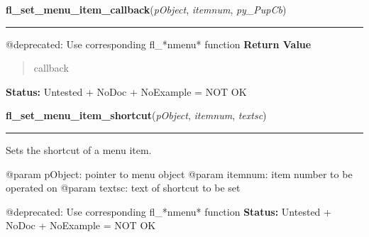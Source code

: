 \hspace{.8\funcindent}\begin{boxedminipage}{\funcwidth}

    \raggedright \textbf{fl\_set\_menu\_item\_callback}(\textit{pObject}, \textit{itemnum}, \textit{py\_PupCb})

    \vspace{-1.5ex}

    \rule{\textwidth}{0.5\fboxrule}
\setlength{\parskip}{2ex}

@deprecated: Use corresponding fl\_*nmenu* function
\setlength{\parskip}{1ex}
      \textbf{Return Value}
    \vspace{-1ex}

      \begin{quote}

callback
      \end{quote}

\textbf{Status:} 
Untested + NoDoc + NoExample = NOT OK


    \end{boxedminipage}

    \label{xformslib:deprecated:fl_set_menu_item_shortcut}

    \vspace{0.5ex}

\hspace{.8\funcindent}\begin{boxedminipage}{\funcwidth}

    \raggedright \textbf{fl\_set\_menu\_item\_shortcut}(\textit{pObject}, \textit{itemnum}, \textit{textsc})

    \vspace{-1.5ex}

    \rule{\textwidth}{0.5\fboxrule}
\setlength{\parskip}{2ex}

Sets the shortcut of a menu item.

@param pObject: pointer to menu object
@param itemnum: item number to be operated on
@param textsc: text of shortcut to be set

@deprecated: Use corresponding fl\_*nmenu* function
\setlength{\parskip}{1ex}
\textbf{Status:} 
Untested + NoDoc + NoExample = NOT OK


    \end{boxedminipage}

    \label{xformslib:deprecated:fl_set_menu_item_mode}

